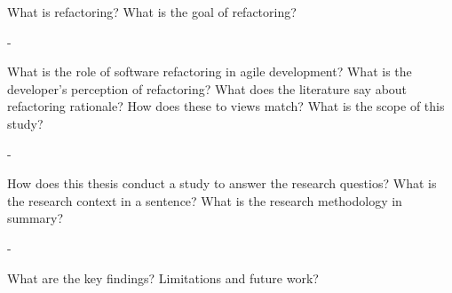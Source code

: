 \documentclass[english,12pt,a4paper,pdftex,sci,utf8]{aaltothesis}
\begin{document}

\date{31.03.2015}




\makecoverpage



\begin{abstractpage}[english]
What is refactoring? What is the goal of refactoring?

-

What is the role of software refactoring in agile development? What is the developer's perception of refactoring? What does the literature say about refactoring rationale? How does these to views match? What is the scope of this study?

-

How does this thesis conduct a study to answer the research questios? What is the research context in a sentence? What is the research methodology in summary?

-

What are the key findings? Limitations and future work?
\end{abstractpage}
\end{document}
